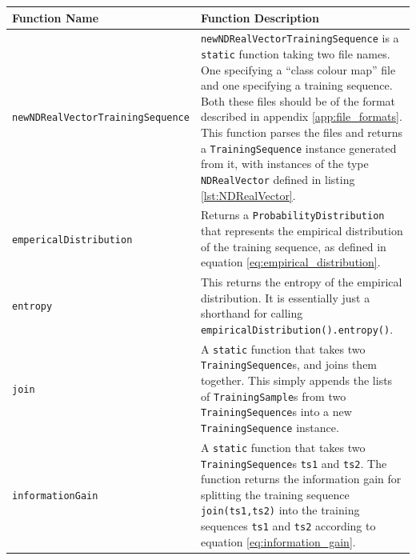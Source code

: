\documentclass[12pt,twoside,notitlepage]{report}
\begin{document}
                \begin{table}[H]
                    \begin{tabularx}{\textwidth}{p{4.5cm}|X}
                        \textbf{Function Name} & \textbf{Function Description} \\
                        \hline

                        {\tt newNDRealVector\-TrainingSequence} & 
                            \texttt{newNDRealVectorTrainingSequence} is a \texttt{static} function taking two file names. 
                            One specifying 
                            a ``class colour map'' file and one specifying a training sequence. Both these files should 
                            be of the format described in appendix \ref{app:file_formats}. This function parses the 
                            files and returns a \texttt{TrainingSequence} instance generated from it, with instances 
                            of the type \texttt{NDRealVector} defined in listing \ref{lst:NDRealVector}. \\ 
                        \hline

                        \texttt{empericalDistribution} & 
                            Returns a \texttt{ProbabilityDistribution} that represents the empirical distribution of the 
                            training sequence, as defined in equation \ref{eq:empirical_distribution}. \\
                        \hline

                        \texttt{entropy} & 
                            This returns the entropy of the empirical distribution. It is essentially just a shorthand 
                            for calling \texttt{empiricalDistribution().entropy()}. \\
                        \hline

                        \texttt{join} & 
                            A \texttt{static} function that takes two \texttt{TrainingSequence}s, and joins them 
                            together. This simply appends the lists of \texttt{TrainingSample}s from two 
                            \texttt{TrainingSequence}s into a new \texttt{TrainingSequence} instance. \\
                        \hline

                        \texttt{informationGain} & 
                            A \texttt{static} function that takes two \texttt{TrainingSequence}s \texttt{ts1} and 
                            \texttt{ts2}. The function returns the information gain for splitting the training 
                            sequence \texttt{join(ts1,ts2)} into the training sequences \texttt{ts1} and \texttt{ts2} 
                            according to equation \ref{eq:information_gain}. \\
                        \hline


\end{tabularx}
\end{table}
\end{document}
